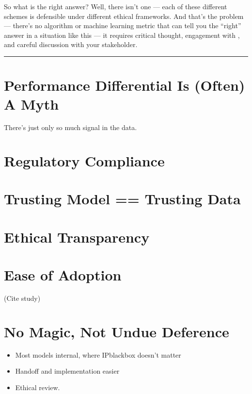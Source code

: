 \documentclass[letterpaper,10pt,english]{jupyterBook}
\begin{document}
\sphinxAtStartPar
So what is the right answer? Well, there isn’t one — each of these different schemes is defensible under different ethical frameworks. And that’s the problem — there’s no algorithm or machine learning metric that can tell you the “right” answer in a situation like this — it requires critical thought, engagement with {\hyperref[\detokenize{30_questions/05_descriptive_v_prescriptive::doc}]{}}, and careful discussion with your stakeholder.


\bigskip\hrule\bigskip


\sphinxstepscope


\chapter{Performance Differential Is (Often) A Myth}
\label{\detokenize{30_questions/27_interpretable_models:performance-differential-is-often-a-myth}}\label{\detokenize{30_questions/27_interpretable_models::doc}}
\sphinxAtStartPar
There’s just only so much signal in the data.


\chapter{Regulatory Compliance}
\label{\detokenize{30_questions/27_interpretable_models:regulatory-compliance}}

\chapter{Trusting Model == Trusting Data}
\label{\detokenize{30_questions/27_interpretable_models:trusting-model-trusting-data}}

\chapter{Ethical Transparency}
\label{\detokenize{30_questions/27_interpretable_models:ethical-transparency}}

\chapter{Ease of Adoption}
\label{\detokenize{30_questions/27_interpretable_models:ease-of-adoption}}
\sphinxAtStartPar
(Cite study)


\chapter{No Magic, Not Undue Deference}
\label{\detokenize{30_questions/27_interpretable_models:no-magic-not-undue-deference}}\begin{itemize}
\item {} 
\sphinxAtStartPar
Most models internal, where IP\sphinxhyphen{}black\sphinxhyphen{}box doesn’t matter

\item {} 
\sphinxAtStartPar
Handoff and implementation easier

\item {} 
\sphinxAtStartPar
Ethical review.

\end{itemize}
\end{document}
